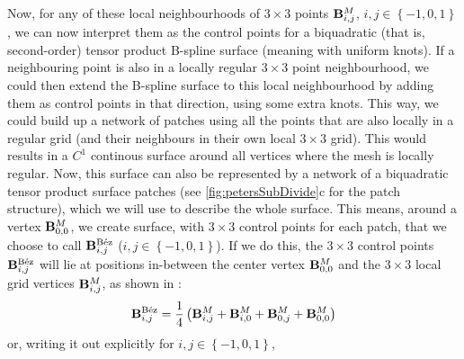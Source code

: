 Now, for any of these local neighbourhoods of $3\times3$ points $\petersLocalPatchPointIndices{i,j}$, $i,j \in \left \lbrace-1,0,1\right \rbrace$, we can now interpret them as the control points for a biquadratic (that is, second-order) tensor product B-spline surface (meaning with uniform knots). If a neighbouring point is also in a locally regular  $3\times3$ point neighbourhood, we could then extend the B-spline surface to this local neighbourhood by adding them as control points in that direction, using some extra knots. This way, we could build up a network of patches using all the points that are also locally in a regular grid (and their neighbours in their own local $3\times3$ grid). This would results in a $C^1$ continous surface around all vertices where the mesh is locally regular.
Now, this surface can also be represented by a network of a biquadratic tensor product \Bez surface patches (see \autoref{fig:petersSubDivide}c for the patch structure), which we will use to describe the whole surface. This means, around a vertex $\petersLocalPatchPointIndices{0,0}$, we create \Bez surface, with $3\times3$ control points for each patch, that we choose to call $\petersLocalBezPointIndices{i,j}$ ($i,j \in \left \lbrace{-1},0,1\right \rbrace$). If we do this, the $3\times3$ \Bez control points $\petersLocalBezPointIndices{i,j}$ will lie at positions in-between the center vertex $\petersLocalPatchPointIndices{0,0}$ and the $3\times3$ local grid vertices $\petersLocalPatchPointIndices{i,j}$, as shown in \cite{peters1992constructing}:
\begin{equation}
\petersLocalBezPointIndices{i,j} = \frac{1}{4}\left(\petersLocalPatchPointIndices{i,j} + \petersLocalPatchPointIndices{i,0} + \petersLocalPatchPointIndices{0,j} + \petersLocalPatchPointIndices{0,0}\right)
\end{equation}
or, writing it out explicitly for $i,j \in \left \lbrace{-1},0,1\right \rbrace$,

